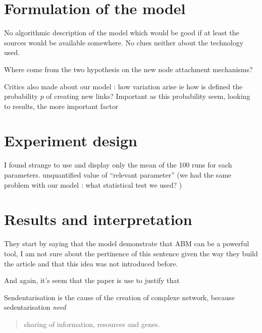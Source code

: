 \documentclass[a4paper]{article}
\begin{document}
\section{Formulation of the model}

No algorithmic description of the model which would be good if at least the sources would be available somewhere. No clues neither about the technology used.

Where come from the two hypothesis on the new node attachment mechanisms?

Critics also made about our model : how variation arise ie how is defined the probability $p$ of creating new links? Important as this probability seem, looking to results, the more important factor

\section{Experiment design}

I found strange to use and display only the mean of the 100 runs for each parameters.
unquantified value of ``relevant parameter'' (we had the same problem with our model : what statistical test we used? )

\section{Results and interpretation}
They start by saying that the model demonstrate that ABM can be a powerful tool, I am not sure about the pertinence of this sentence given the way they build the article and that this idea was not introduced before.

And again, it's seem that the paper is use to justify that 

Sendentarisation is the cause of the creation of complexe network, because sedentarisation \emph{need}
\begin{quote}
    sharing of information, resources and genes.
\end{quote}


  
\end{document}
